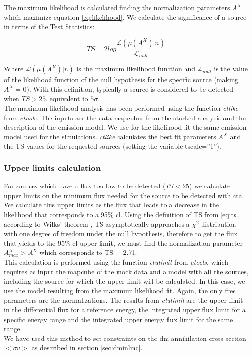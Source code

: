 \documentclass[main.tex]{subfiles}
\begin{document}
The maximum likelihood is calculated finding the normalization parameters $A^{X}$ which maximize equation \ref{eq:likelihood}.
We calculate the significance of a source in terms of the Test Statistics:

\begin{equation}
  TS = 2log \frac{\mathcal{L}(\mu(A^{X})|n)}{\mathcal{L}_{null}}
  \label{eq:ts}
\end{equation}

Where $\mathcal{L}(\mu(A^{X})|n)$ is the maximum likelihood function and $\mathcal{L}_{null}$ is the value of the likelihood function of the null hypothesis for the specific source (making $A^X$ = 0). With this definition, typically a source is considered to be detected when $TS>25$, equivalent to $5\sigma$.\\
The maximum likelihood analysis has been performed using the function \textit{ctlike} from \textit{ctools}. The inputs are the data mapcubes from the stacked analysis and the description of the emission model. We use for the likelihood fit the same emission model used for the simulations. \textit{ctlike} calculates the best fit parameters $A^X$ and the TS values for the requested sources (setting the variable tscalc=''1'').

\subsubsection{Upper limits calculation}

For sources which have a flux too low to be detected ($TS < 25$) we calculate upper limits on the minimum flux needed for the source to be detected with \gls{cta}. We calculate this upper limits as the flux that leads to a decrease in the likelihood that corresponds to a 95\% \gls{cl}. Using the definition of TS from \ref{eq:ts}, according to Wilks' theorem \cite{wilks1938}, TS asymptotically approaches a $\chi^2$-distribution with one degree of freedom under the null hypothesis, therefore to get the flux that yields to the 95\% \gls{cl} upper limit, we must find the normalization parameter $A^X_{max} > A^{X}$ which corresponds to TS = 2.71.\\
This calculation is performed using the function \textit{ctulimit} from \textit{ctools}, which requires as input the mapcube of the mock data and a model with all the sources, including the source for which the upper limit will be calculated. In this case, we use the model resulting from the maximum likelihood fit. Again, the only free parameters are the normalizations. The results from \textit{ctulimit} are the upper limit in the differential flux for a reference energy, the integrated upper flux limit for a specific energy range and the integrated upper energy flux limit for the same range.\\
We have used this method to set constraints on the \gls{dm} annihilation cross section $<\sigma v>$ as described in section \ref{sec:dminlmc}.
\end{document}
